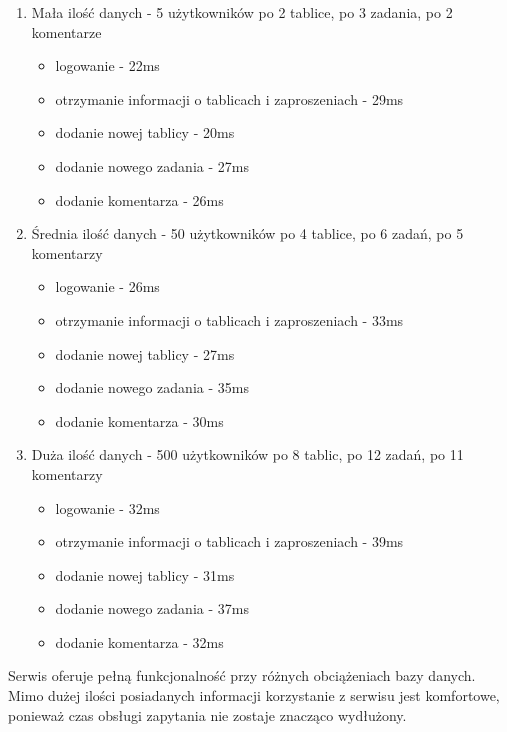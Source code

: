 \documentclass[12pt]{report}
\begin{document}
\begin{enumerate} 
	\item
	Mała ilość danych - 5 użytkowników po 2 tablice, po 3 zadania, po 2 komentarze
	\begin{itemize}
	  \item logowanie - 22ms
	  \item otrzymanie informacji o tablicach i zaproszeniach - 29ms
	  \item dodanie nowej tablicy - 20ms
	  \item dodanie nowego zadania - 27ms
	  \item dodanie komentarza - 26ms
	\end{itemize}
	\item
	Średnia ilość danych - 50 użytkowników po 4 tablice, po 6 zadań, po 5 komentarzy
	\begin{itemize}
	  \item logowanie - 26ms
	  \item otrzymanie informacji o tablicach i zaproszeniach - 33ms
	  \item dodanie nowej tablicy - 27ms
	  \item dodanie nowego zadania - 35ms
	  \item dodanie komentarza - 30ms
	\end{itemize}
	\item
	Duża ilość danych - 500 użytkowników po 8 tablic, po 12 zadań, po 11 komentarzy
	\begin{itemize}
	  \item logowanie - 32ms
	  \item otrzymanie informacji o tablicach i zaproszeniach - 39ms
	  \item dodanie nowej tablicy - 31ms
	  \item dodanie nowego zadania - 37ms
	  \item dodanie komentarza - 32ms
	\end{itemize}
\end{enumerate} 
Serwis oferuje pełną funkcjonalność przy różnych obciążeniach bazy danych.
Mimo dużej ilości posiadanych informacji korzystanie z serwisu jest komfortowe, ponieważ czas obsługi zapytania nie zostaje znacząco wydłużony.
\end{document}
